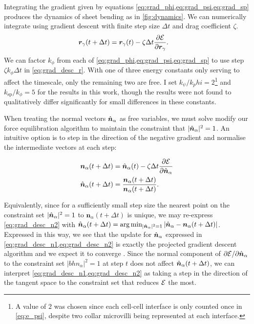 Integrating the gradient given by equations \cref{eq:grad_phi,eq:grad_psi,eq:grad_sp} produces the dynamics of sheet bending as in \cref{fig:dynamics}. 
We can numerically integrate using gradient descent with finite step size $\Delta t$ and drag coefficient $\zeta$.
\begin{align}
	\bm{r}_\gamma(t+\Delta t) &= \bm{r}_\gamma (t) - \zeta \Delta t \frac{\partial \mathcal{E}}{\partial \bm{r}_\gamma}. \label{eq:grad_desc_r}
\end{align}
We can factor $k_\phi$ from each of \cref{eq:grad_phi,eq:grad_psi,eq:grad_sp} to use step $\zeta k_\phi \Delta t$ in \cref{eq:grad_desc_r}.
With one of three energy constants only serving to affect the timescale, only the remaining two are free.
I set $k_\psi / k_phi = 2$\footnote{A value of $2$ was chosen since each cell-cell interface is only counted once in \cref{eq:e_psi}, despite two collar microvilli being represented at each interface.} and $k_{\text{sp}} / k_\phi = 5$ for the results in this work, though the results were not found to qualitatively differ significantly for small differences in these constants.


When treating the normal vectors $\hat{\bm{n}}_\alpha$ as free variables, we must solve modify our force equilibration algorithm to maintain the constraint that $| \hat{\bm{n}}_\alpha |^2 = 1$. 
An intuitive option is to step in the direction of the negative gradient and normalise the intermediate vectors at each step:

\begin{align}
	\bm{n}_\alpha(t+\Delta t) &= \hat{\bm{n}}_\alpha(t) - \zeta \Delta t \frac{\partial \mathcal{E}}{\partial \hat{\bm{n}}_\alpha} \label{eq:grad_desc_n1}\\
	\hat{\bm{n}}_\alpha(t+\Delta t) &= \frac{\bm{n}_\alpha(t+\Delta t)}{\bm{n}_\alpha(t+\Delta t)}. \label{eq:grad_desc_n2}
\end{align}

Equivalently, since for a sufficiently small step size the nearest point on the constraint set $|\hat{\bm{n}}_\alpha|^2=1$ to $\bm{n}_\alpha(t+\Delta t)$ is unique, we may re-express \cref{eq:grad_desc_n2} with $\hat{\bm{n}}_\alpha(t + \Delta t) = \arg \min_{|\hat{\bm{n}}_\alpha|^2 = 1} |\hat{\bm{n}}_\alpha - \bm{n}_\alpha(t+\Delta t)|$.
Expressed in this way, we see that the update for $\hat{\bm{n}}_\alpha$ expressed in \cref{eq:grad_desc_n1,eq:grad_desc_n2} is exactly the projected gradient descent algorithm and we expect it to converge \citep{eicke1992}.
Since the normal component of $\partial \mathcal{E} / \partial \hat{\bm{n}}_\alpha$ to the constraint set $|bh{n}_\alpha|^2 = 1$ at step $t$ does not affect $\hat{\bm{n}}_\alpha(t + \Delta t)$, we can interpret \cref{eq:grad_desc_n1,eq:grad_desc_n2} as taking a step in the direction of the tangent space to the constraint set that reduces $\mathcal{E}$ the most.

